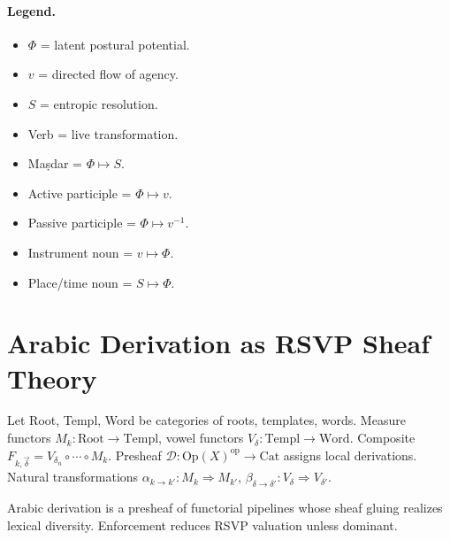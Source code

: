 \documentclass[12pt]{article}
\begin{document}
\paragraph{Legend.}
\begin{itemize}
  \item $\Phi$ = latent postural potential.
  \item $v$ = directed flow of agency.
  \item $S$ = entropic resolution.
  \item Verb = live transformation.
  \item Maṣdar = $\Phi \mapsto S$.
  \item Active participle = $\Phi \mapsto v$.
  \item Passive participle = $\Phi \mapsto v^{-1}$.
  \item Instrument noun = $v \mapsto \Phi$.
  \item Place/time noun = $S \mapsto \Phi$.
\end{itemize}

\section{Arabic Derivation as RSVP Sheaf Theory}
\label{app:sheaf}
Let Root, Templ, Word be categories of roots, templates, words. Measure functors $M_k: \mathrm{Root} \to \mathrm{Templ}$, vowel functors $V_\delta: \mathrm{Templ} \to \mathrm{Word}$. Composite $F_{k,\vec{\delta}} = V_{\delta_n} \circ \cdots \circ M_k$. Presheaf $\mathcal{D}: \mathrm{Op}(X)^{\mathrm{op}} \to \mathrm{Cat}$ assigns local derivations. Natural transformations $\alpha_{k\to k'}: M_k \Rightarrow M_{k'}$, $\beta_{\delta\to\delta'}: V_\delta \Rightarrow V_{\delta'}$.


\begin{theorem*}
Arabic derivation is a presheaf of functorial pipelines whose sheaf gluing realizes lexical diversity. Enforcement reduces RSVP valuation unless dominant.
\end{theorem*}
\end{document}
